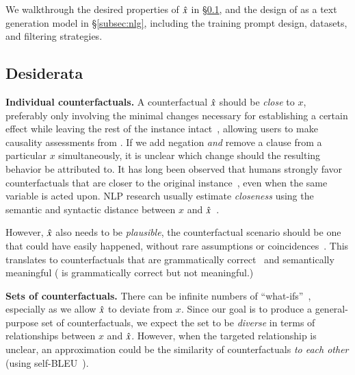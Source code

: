 We walkthrough the desired properties of $\hat{x}$ in \S\ref{sec:desiderata}, and the design of \sysname as a text generation model in \S\ref{subsec:nlg}, including the training prompt design, datasets, and filtering strategies.

% 
\subsection{Desiderata}
\label{sec:desiderata}


\textbf{Individual counterfactuals.} 
A counterfactual $\hat{x}$ should be \emph{close} to $x$, preferably only involving the minimal changes necessary for establishing a certain effect while leaving the rest of the instance intact~\cite{pearl2018causal}, allowing users to make causality assessments from \relation{\xp}. 
If we add negation \emph{and} remove a clause from a particular $x$ simultaneously, it is unclear which change should the resulting behavior be attributed to. 
It has long been observed that humans strongly favor counterfactuals that are closer to the original instance~\cite{kahneman}, even when the same variable is acted upon.
NLP research usually estimate \emph{closeness} using the semantic and syntactic distance between $x$ and $\hat{x}$~\cite{morris2020textattack, madaan2020generate}.

However, $\hat{x}$ also needs to be \emph{plausible}, \ie the counterfactual scenario should be one that could have easily happened, without rare assumptions or coincidences~\cite{kahneman}. 
This translates to counterfactuals that are grammatically correct~\cite{morris2020textattack} and semantically meaningful (\eg {} is grammatically correct but not meaningful.) 

\textbf{Sets of counterfactuals.} There can be infinite numbers of ``what-ifs''~\cite{pearl2018causal, kahneman}, especially as we allow $\hat{x}$ to deviate from $x$. Since our goal is to produce a general-purpose set of counterfactuals, we expect the set to be \emph{diverse} in terms of relationships between $x$ and $\hat{x}$.
However, when the targeted relationship is unclear, an approximation could be the similarity of counterfactuals \emph{to each other} (using \eg self-BLEU~\cite{Hu2017TowardCG}).



